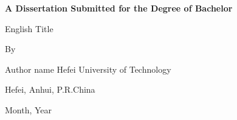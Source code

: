 \begin{titlepage}
\centering
{
\parskip=0pt \linespread{1.25}
\sanhao \bfseries{A Dissertation Submitted for the Degree of Bachelor}\vspace{4.7cm}

\Large{English Title} \vspace{1.8cm}}

{\sanhao By

Author name
\vfill
Hefei University of Technology

Hefei, Anhui, P.R.China

Month, Year
\vspace{3cm}
}

\end{titlepage}
